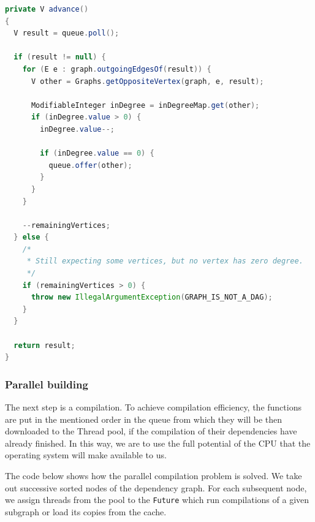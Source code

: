 \begin{lstlisting}[language=Java, caption={Kahn's algorithm 2}, label={buildsystem:listing2}, caption={%
  Implementation of the algorithm from the JGraphT library pt. 2 \cite{JGRAPHT}%
}]
private V advance()
{
  V result = queue.poll();

  if (result != null) {
    for (E e : graph.outgoingEdgesOf(result)) {
      V other = Graphs.getOppositeVertex(graph, e, result);

      ModifiableInteger inDegree = inDegreeMap.get(other);
      if (inDegree.value > 0) {
        inDegree.value--;

        if (inDegree.value == 0) {
          queue.offer(other);
        }
      }
    }

    --remainingVertices;
  } else {
    /*
     * Still expecting some vertices, but no vertex has zero degree.
     */
    if (remainingVertices > 0) {
      throw new IllegalArgumentException(GRAPH_IS_NOT_A_DAG);
    }
  }

  return result;
}
\end{lstlisting}

\hypertarget{parallel-building}{%
\subsubsection{Parallel building}\label{parallel-building}}

The next step is a compilation. To achieve compilation efficiency, the
functions are put in the mentioned order in the queue from which they
will be then downloaded to the Thread pool, if the compilation of their
dependencies have already finished. In this way, we are to use the full
potential of the CPU that the operating system will make available to
us.

The code below shows how the parallel compilation problem is solved.
We take out successive sorted nodes of the dependency graph.
For each subsequent node, we assign threads from the pool to the 
\texttt{Future} which run compilations of a given subgraph
or load its copies from the cache.

